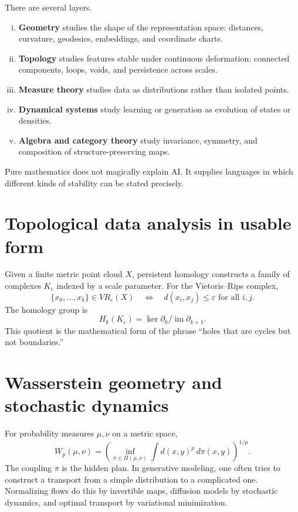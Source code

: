 There are several layers.

\begin{enumerate}[(i)]
  \item \textbf{Geometry} studies the shape of the representation space: distances, curvature, geodesics, embeddings, and coordinate charts.
  \item \textbf{Topology} studies features stable under continuous deformation: connected components, loops, voids, and persistence across scales.
  \item \textbf{Measure theory} studies data as distributions rather than isolated points.
  \item \textbf{Dynamical systems} study learning or generation as evolution of states or densities.
  \item \textbf{Algebra and category theory} study invariance, symmetry, and composition of structure-preserving maps.
\end{enumerate}

Pure mathematics does not magically explain AI.  It supplies languages in which different kinds of stability can be stated precisely.

\section{Topological data analysis in usable form}

Given a finite metric point cloud $X$, persistent homology constructs a family of complexes $K_\varepsilon$ indexed by a scale parameter.  For the Vietoris--Rips complex,
\[
  \{x_0,\ldots,x_k\}\in VR_\varepsilon(X)
  \quad\Longleftrightarrow\quad
  d(x_i,x_j)\le \varepsilon\text{ for all }i,j.
\]
The homology group is
\[
  H_k(K_\varepsilon)=\ker \partial_k/\operatorname{im}\partial_{k+1}.
\]
This quotient is the mathematical form of the phrase ``holes that are cycles but not boundaries.''

\section{Wasserstein geometry and stochastic dynamics}

For probability measures $\mu,\nu$ on a metric space,
\[
  W_p(\mu,\nu)=\left(\inf_{\pi\in \Pi(\mu,\nu)}\int d(x,y)^p\,d\pi(x,y)\right)^{1/p}.
\]
The coupling $\pi$ is the hidden plan.  In generative modeling, one often tries to construct a transport from a simple distribution to a complicated one.  Normalizing flows do this by invertible maps, diffusion models by stochastic dynamics, and optimal transport by variational minimization.

